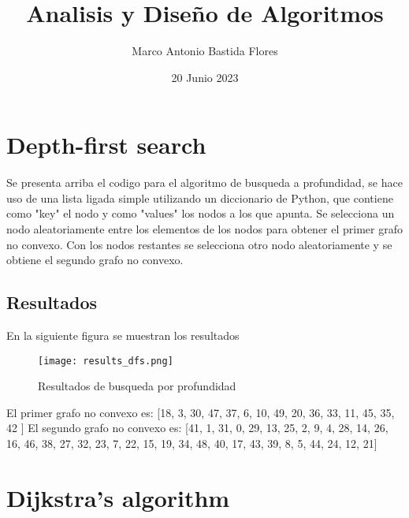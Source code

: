 \documentclass{article}
\title{Analisis y Diseño de Algoritmos}
\author{Marco Antonio Bastida Flores}
\date{20 Junio 2023}
\begin{document}
\maketitle

\section{Depth-first search}

\vspace{5mm} %



\vspace{5mm} %

Se presenta arriba el codigo para el algoritmo de busqueda a profundidad, se hace uso de una lista ligada simple utilizando un diccionario de Python, que contiene como "key" el nodo y como "values" los nodos a los que apunta. 
Se selecciona un nodo aleatoriamente entre los elementos de los nodos para obtener el primer grafo no convexo. 
Con los nodos restantes se selecciona otro nodo aleatoriamente y se obtiene el segundo grafo no convexo. 

\vspace{5mm} %

\subsection{Resultados}

En la siguiente figura se muestran los resultados

\begin{figure}[ht]
    \centering
    \texttt{[image: results\_dfs.png]}
    \caption{Resultados de busqueda por profundidad}
    \label{fig:dfs}
\end{figure}

\vspace{5mm} %

El primer grafo no convexo es: [18, 3, 30, 47, 37, 6, 10, 49, 20, 36, 33, 11, 45, 35, 42 ]\newline
El segundo grafo no convexo es: [41, 1, 31, 0, 29, 13, 25, 2, 9, 4, 28, 14, 26, 16, 46, 38, 27, 32, 23, 7, 22, 15, 19, 34, 48, 40, 17, 43, 39, 8, 5, 44, 24, 12, 21] \newpage

\section{Dijkstra’s algorithm}
\end{document}
